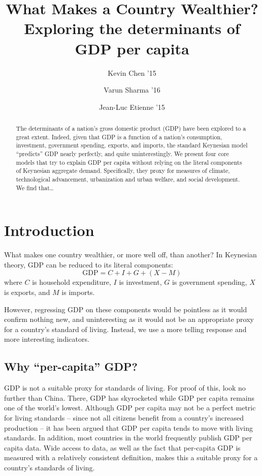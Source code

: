 \documentclass[12pt]{article}
\title{
  \sc
  What Makes a Country Wealthier? \\
  {\large Exploring the determinants of GDP per capita}
}
\author{
    {\rm Kevin Chen '15} \\ 
    \and
    {\rm Varun Sharma '16} \\ 
    \and
    {\rm Jean-Luc Etienne '15} \\ 
}
\begin{document}
\date{}
\maketitle
\doublespacing


\begin{abstract}
The determinants of a nation's gross domestic product (GDP) have been explored to a great extent. Indeed, given that GDP is a function of a nation's consumption, investment, government spending, exports, and imports, the standard Keynesian model ``predicts'' GDP nearly perfectly, and quite uninterestingly. We present four core models that try to explain GDP per capita without relying on the literal components of Keynesian aggregate demand. Specifically, they proxy for measures of climate, technological advancement, urbanization and urban welfare, and social development.
We find that\dots %
\end{abstract}

\newpage

\section{Introduction}
What makes one country wealthier, or more well off, than another? In Keynesian theory, GDP can be reduced to its literal components:
$$\mathrm{GDP} = C + I + G + (X - M)$$
where $C$ is household expenditure, $I$ is investment,  $G$ is government spending, $X$ is exports, and $M$ is imports.

However, regressing GDP on these components would be pointless as it would confirm nothing new, and uninteresting as it would not be an appropriate proxy for a country's standard of living. Instead, we use a more telling response and more interesting indicators.

\subsection{Why ``per-capita'' GDP?}
GDP is not a suitable proxy for standards of living. For proof of this, look no further than China. There, GDP has skyrocketed while GDP per capita remains one of the world's lowest. Although GDP per capita may not be a perfect metric for living standards -- since not all citizens benefit from a country's increased production -- it has been argued that GDP per capita tends to move with living standards. In addition, most countries in the world frequently publish GDP per capita data. Wide access to data, as well as the fact that per-capita GDP is measured with a relatively consistent definition, makes this a suitable proxy for a country's standards of living.
\end{document}
